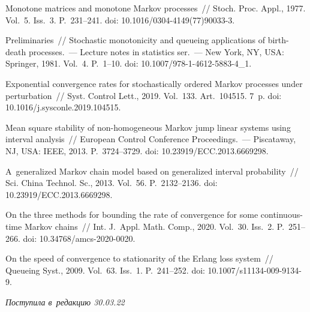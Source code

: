 \begin{multicols}{2}
{{\begin{thebibliography}{9}
 Monotone matrices and monotone Markov processes~// 
Stoch. Proc. Appl., 1977. Vol.~5. Iss.~3. P.~231--241. 
doi: 10.1016/0304-4149(77)90033-3.

 Preliminaries~// Stochastic monotonicity and queueing 
applications of birth-death processes.~--- Lecture notes in statistics ser.~--- 
New York, NY, USA: Springer, 1981.  Vol.~4. P.~1--10. doi: 10.1007/978-1-4612-5883-4\_1.

 Exponential convergence rates for 
stochastically ordered Markov processes under perturbation~// Syst. Control 
Lett., 2019. Vol.~133. Art.~104515. 7~p. doi: 10.1016/j.sysconle.2019.104515.


 Mean square stability of non-homogeneous 
Markov jump linear systems using interval analysis~// European 
Control Conference Proceedings.~--- Piscataway, NJ, USA: IEEE, 2013. P.~3724--3729. 
doi: 10.23919/ECC.2013.6669298.

 A~generalized Markov chain model based on 
generalized interval probability~// Sci. China Technol. Sc., 2013. Vol.~56. 
P.~2132--2136. doi: 10.23919/ECC.2013.6669298.


 On the three methods for bounding the rate of convergence for some 
continuous-time Markov chains~// Int. J.~Appl. Math. Comp., 2020. 
Vol.~30. Iss.~2. P.~251--266. doi: 10.34768/amcs-2020-0020.

  On the speed of convergence to 
stationarity of the Erlang loss system~// Queueing Syst., 2009. Vol.~63. 
Iss.~1. P.~241--252. doi: 10.1007/s11134-009-9134-9.

\end{thebibliography}

 }
 }
 

\end{multicols}

\vspace*{-12pt}

\hfill{\small\textit{Поступила в~редакцию 30.03.22}}

\vspace*{6pt}



